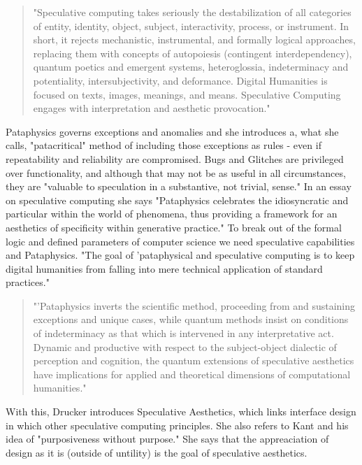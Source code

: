 \begin{quote}
  "Speculative computing takes seriously the destabilization of all categories of entity, identity, object, subject, interactivity, process, or instrument. In short, it rejects mechanistic, instrumental, and formally logical approaches, replacing them with concepts of autopoiesis (contingent interdependency), quantum poetics and emergent systems, heteroglossia, indeterminacy and potentiality, intersubjectivity, and deformance. Digital Humanities is focused on texts, images, meanings, and means. Speculative Computing engages with interpretation and aesthetic provocation." \citep[p.29]{Drucker2009}
\end{quote}

Pataphysics governs exceptions and anomalies and she introduces a, what she calls, "patacritical" method of including those exceptions as rules - even if repeatability and reliability are compromised. Bugs and Glitches are privileged over functionality, and although that may not be as useful in all circumstances, they are "valuable to speculation in a substantive, not trivial, sense." In an essay on speculative computing \citep{Drucker2007} she says  "Pataphysics celebrates the idiosyncratic and particular within the world of phenomena, thus providing a framework for an aesthetics of specificity within generative practice." To break out of the formal logic and defined parameters of computer science we need speculative capabilities and Pataphysics. "The goal of 'pataphysical and speculative computing is to keep digital humanities from falling into mere technical application of standard practices."

\begin{quote}
  "'Pataphysics inverts the scientific method, proceeding from and sustaining exceptions and unique cases, while quantum methods insist on conditions of indeterminacy as that which is intervened in any interpretative act. Dynamic and productive with respect to the subject-object dialectic of perception and cognition, the quantum extensions of speculative aesthetics have implications for applied and theoretical dimensions of computational humanities." \citep{Drucker2007}
\end{quote}

With this, Drucker introduces Speculative Aesthetics, which links interface design in which other speculative computing principles. She also refers to Kant and his idea of "purposiveness without purpose." She says that the appreaciation of design as it is (outside of untility) is the goal of speculative aesthetics.

